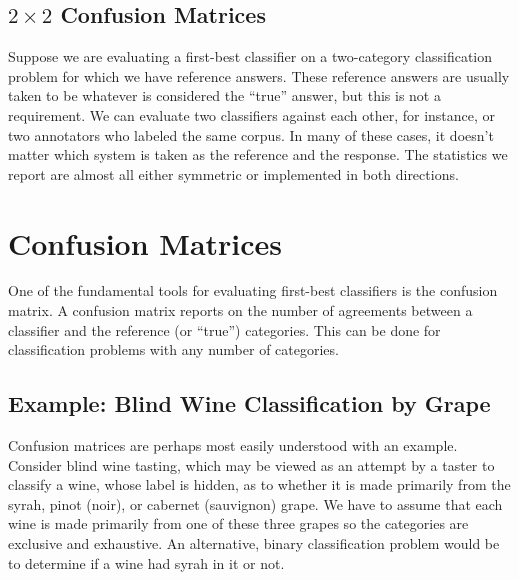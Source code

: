 \subsection{$2 \times 2$ Confusion Matrices}

Suppose we are evaluating a first-best classifier on a two-category
classification problem for which we have reference answers.  These
reference answers are usually taken to be whatever is considered
the ``true'' answer, but this is not a requirement.  We can evaluate
two classifiers against each other, for instance, or two annotators
who labeled the same corpus.  In many of these cases, it doesn't
matter which system is taken as the reference and the response.  The
statistics we report are almost all either symmetric or implemented
in both directions.





\section{Confusion Matrices}\label{section:classifier-eval-confusion-matrix}

One of the fundamental tools for evaluating first-best classifiers is
the confusion matrix.  A confusion matrix reports on the number of
agreements between a classifier and the reference (or ``true'')
categories.  This can be done for classification problems with any
number of categories.

\subsection{Example: Blind Wine Classification by Grape}

Confusion matrices are perhaps most easily understood with an example.
Consider blind wine tasting, which may be viewed as an attempt by a
taster to classify a wine, whose label is hidden, as to whether it is
made primarily from the syrah, pinot (noir), or cabernet (sauvignon)
grape.  We have to assume that each wine is made primarily from one of
these three grapes so the categories are exclusive and exhaustive.  An
alternative, binary classification problem would be to determine if
a wine had syrah in it or not.

